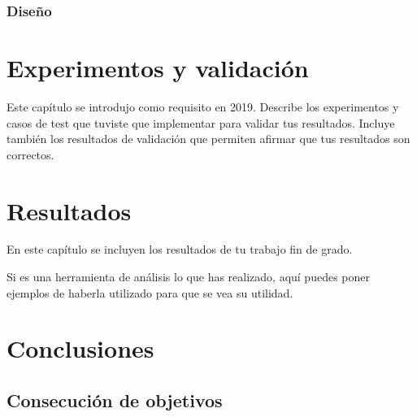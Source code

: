 \documentclass[a4paper, 12pt]{book}
\begin{document}
\subsection{Diseño}


\cleardoublepage
\chapter{Experimentos y validación}

Este capítulo se introdujo como requisito en 2019. 
Describe los experimentos y casos de test que tuviste que implementar para validar tus resultados. 
Incluye también los resultados de validación que permiten afirmar que tus resultados son correctos. 



\cleardoublepage
\chapter{Resultados}

En este capítulo se incluyen los resultados de tu trabajo fin de grado.

Si es una herramienta de análisis lo que has realizado, aquí puedes poner ejemplos de haberla utilizado para que se vea su utilidad.



\cleardoublepage
\chapter{Conclusiones}
\label{chap:conclusiones}


\section{Consecución de objetivos}
\label{sec:consecucion-objetivos}
\end{document}
